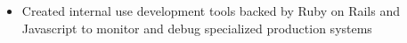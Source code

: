 \documentclass[10pt,a4paper]{altacv}
\newenvironment{tightitemize} %
{\begin{itemize}\itemsep1pt \parskip0pt \parsep0pt}
{\end{itemize}\vspace{-\topsep}}
\begin{document}
\smallskip
\divider

\begin{tightitemize}
\item Created internal use development tools backed by Ruby on Rails 
    and Javascript to monitor and debug specialized production systems
\end{tightitemize}










\end{document}
